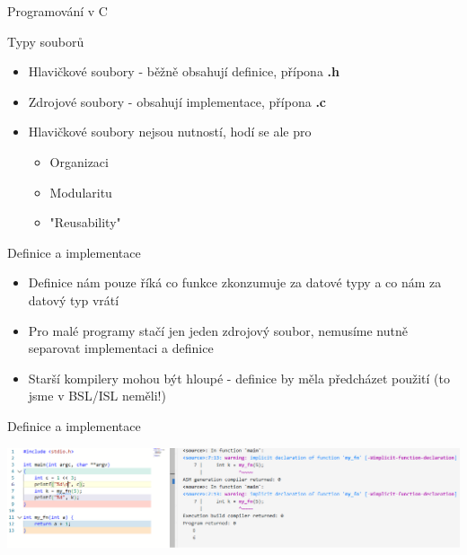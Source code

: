 \documentclass[9pt]{beamer}
\begin{document}
\begin{frame}{Programování v C}

\begin{block}{Typy souborů}
\begin{itemize}
    \item Hlavičkové soubory - běžně obsahují definice, přípona \textbf{.h}
    \item Zdrojové soubory - obsahují implementace, přípona \textbf{.c}
    \item Hlavičkové soubory nejsou nutností, hodí se ale pro
    \begin{itemize}
        \item Organizaci
        \item Modularitu
        \item "Reusability"
    \end{itemize}
\end{itemize}
\end{block}

\pause

\begin{block}{Definice a implementace}
    \begin{itemize}
        \item Definice nám pouze říká co funkce zkonzumuje za datové typy
        a co nám za datový typ vrátí
        \item Pro malé programy stačí jen jeden zdrojový soubor, nemusíme nutně separovat implementaci a definice
        \item Starší kompilery mohou být hloupé - definice by měla předcházet použití (to jsme v BSL/ISL neměli!)
    \end{itemize}
\end{block}

\end{frame}

\begin{frame}{Definice a implementace}
    \begin{center}
        \includegraphics[width=0.98\linewidth]{lekce19/warning-implicit-fn-decl.png}
    \end{center}
\end{frame}
\end{document}
